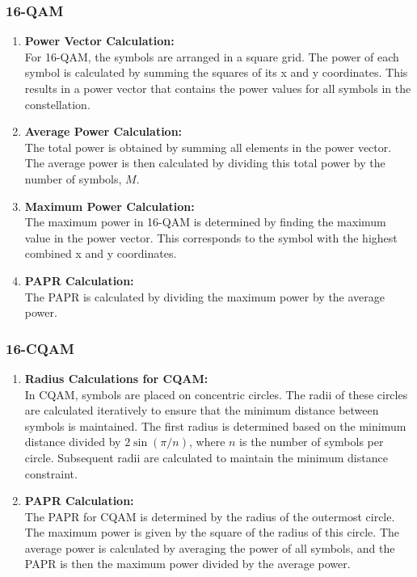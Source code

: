 \documentclass[11pt,a4paper,onecolumn,final]{article}
\begin{document}
\subsubsection*{16-QAM}
\begin{enumerate}
    \item \textbf{Power Vector Calculation:}\\
    For 16-QAM, the symbols are arranged in a square grid. The power of each symbol is calculated by summing the squares of its x and y coordinates. This results in a power vector that contains the power values for all symbols in the constellation.
    \item \textbf{Average Power Calculation:}\\
    The total power is obtained by summing all elements in the power vector. The average power is then calculated by dividing this total power by the number of symbols, \(M\).
    \item \textbf{Maximum Power Calculation:}\\
    The maximum power in 16-QAM is determined by finding the maximum value in the power vector. This corresponds to the symbol with the highest combined x and y coordinates.
    \item \textbf{PAPR Calculation:}\\
    The PAPR is calculated by dividing the maximum power by the average power.
\end{enumerate}

\subsubsection*{16-CQAM}
\begin{enumerate}
    \item \textbf{Radius Calculations for CQAM:}\\
    In CQAM, symbols are placed on concentric circles. The radii of these circles are calculated iteratively to ensure that the minimum distance between symbols is maintained. The first radius is determined based on the minimum distance divided by \(2 \sin(\pi / n)\), where \(n\) is the number of symbols per circle. Subsequent radii are calculated to maintain the minimum distance constraint.
    \item \textbf{PAPR Calculation:}\\
    The PAPR for CQAM is determined by the radius of the outermost circle. The maximum power is given by the square of the radius of this circle. The average power is calculated by averaging the power of all symbols, and the PAPR is then the maximum power divided by the average power.
\end{enumerate}
\end{document}
